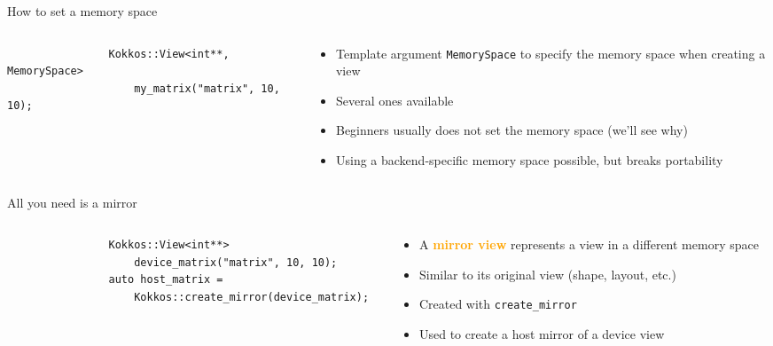 \documentclass[aspectratio=169]{beamer}
\newcommand{\highlight}[1]{\textcolor{orange}{\textbf{#1}}}
\begin{document}

\begin{frame}[fragile]{How to set a memory space}
    \begin{columns}
        \begin{column}{0.5\linewidth}
            \begin{verbatim}
                Kokkos::View<int**, MemorySpace>
                    my_matrix("matrix", 10, 10);
            \end{verbatim}
        \end{column}
        \begin{column}{0.5\linewidth}
            \begin{itemize}
                \item Template argument \texttt{MemorySpace} to specify the memory space when creating a view
                \item Several ones available
                \item Beginners usually does not set the memory space (we'll see why)
                \item Using a backend-specific memory space possible, but breaks portability
            \end{itemize}
        \end{column}
    \end{columns}
\end{frame}


\begin{frame}[fragile]{All you need is a mirror}
    \begin{columns}
        \begin{column}{0.6\linewidth}
            \begin{verbatim}
                Kokkos::View<int**>
                    device_matrix("matrix", 10, 10);
                auto host_matrix =
                    Kokkos::create_mirror(device_matrix);
            \end{verbatim}

        \end{column}
        \begin{column}{0.4\linewidth}
            \begin{itemize}
                \item A \highlight{mirror view} represents a view in a different memory space
                \item Similar to its original view (shape, layout, etc.)
                \item Created with \texttt{create\_mirror}
                \item Used to create a host mirror of a device view
            \end{itemize}
        \end{column}
    \end{columns}
\end{frame}
\end{document}

